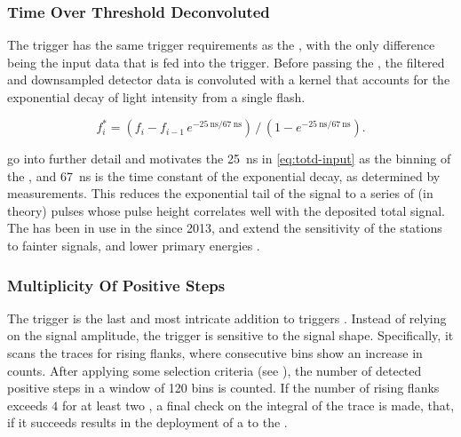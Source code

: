 \subsubsection{Time Over Threshold Deconvoluted}

The \TOTD trigger has the same trigger requirements as the \TOT, with the only
difference being the input data that is fed into the trigger. Before passing 
the \TOTD, the filtered and downsampled detector data is convoluted with a 
kernel that accounts for the exponential decay of light intensity from a single
flash.

\begin{equation}
\label{eq:totd-input}
f^*_i = \left( f_i - f_{i-1} \, e^{-\SI{25}{\nano\second}/\SI{67}{\nano\second}} \right)\,/\,\left( 1 - e^{-\SI{25}{\nano\second}/\SI{67}{\nano\second} } \right).
\end{equation}

\cite{billoirPeakSearchingSurface2002, colemanNewTriggerSettings2018} go into 
further detail and motivates the \SI{25}{\nano\second} in \cref{eq:totd-input} 
as the binning of the \UB, and \SI{67}{\nano\second} is the time constant of 
the exponential decay, as determined by measurements. This reduces the 
exponential tail of the \WCD signal to a series of (in theory) \SB pulses whose
pulse height correlates well with the deposited total signal. The \TOTD has 
been in use in the \SD since 2013, and extend the sensitivity of the \SD 
stations to fainter signals, and lower \EAS primary energies 
\cite{billoirFirstResultsToTd2013}.

\subsubsection{Multiplicity Of Positive Steps}

The \MOPS trigger is the last and most intricate addition to \SD \TTWO triggers
\cite{billoirPropositionImproveLocal13}. Instead of relying on the \WCD signal
amplitude, the \MOPS trigger is sensitive to the signal shape. Specifically, it
scans the \LPMT traces for rising flanks, where consecutive bins show an
increase in \ADC counts. After applying some selection criteria (see 
\cite{colemanNewTriggerSettings2018}), the number of detected positive steps
in a window of 120 bins is counted. If the number of rising flanks exceeds $4$ 
for at least two \LPMTs, a final check on the integral of the \FDS trace is 
made, that, if it succeeds results in the deployment of a \TTWO to the \CDAS.

